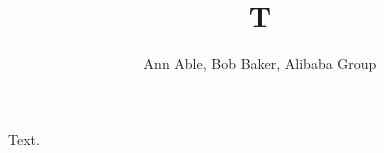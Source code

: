 \documentclass{article}
\begin{document}
\title{T}
\author{Ann Able, Bob Baker, Alibaba Group}
\maketitle
Text.
\end{document}
